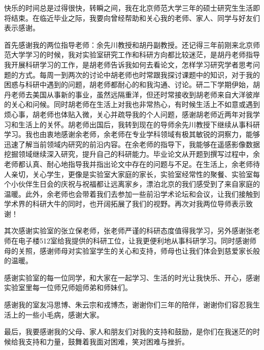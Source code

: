 
\begin{ack}
  快乐的时间总是过得很快，转瞬之间，我在北京师范大学三年的硕士研究生生活即将结束。在临近毕业之际，我要向曾经帮助和关心我的老师、家人、同学与好友们表示感谢。

  首先感谢我的两位指导老师：余先川教授和胡丹副教授。还记得三年前刚来北京师范大学学习的时候，我对实验室研究工作和科研方向都比较迷茫，是胡丹老师指导我开展科研学习的工作，是胡老师告诉我如何去看论文，怎样学习研究学者思考问题的方式。每周一到两次的讨论中胡老师也时常跟我探讨课题中的知识，对于我的困惑与科研中遇到的问题，胡老师都耐心的和我沟通、讨论。研二下学期伊始，胡丹老师去美国从事新的事业，虽然远隔重洋，但还时常接收到胡老师来自大洋彼岸的关心和问候。同时胡老师在生活上对我也非常热心，有时候生活上不如意或遇到烦心事，胡老师也体贴入微，关心并疏导我的个人问题，感谢胡老师近两年对我学习和生活上的关怀。胡老师出国后，我转到现在的导师余先川教授下继续从事科研学习。我也由衷地感谢余老师，余老师在专业学科领域有极其敏锐的洞察力，能够迅速了解当前领域内研究的前沿内容。在余老师的指导下，我能够在遥感影像数据挖掘领域继续深入研究，提升自己的科研能力。毕业论文从开题到撰写过程中，余老师都认真、耐心地指导我并指出论文中存在的问题与不足。在生活上，余老师待人亲切，关心学生，更像是实验室大家庭的家长，实验室经常性的聚餐、实验室每个小伙伴生日会的庆祝与祝福都让远离家乡，漂泊北京的我们感受到了来自家庭的温暖。此外，余老师也会带着我们去参加一些前沿学术论坛和会议，让我们接触到学术界的科研大牛的同时，也开阔拓展了我们的视野。再次对我两位导师表示致谢！

  其次感谢实验室的张立保老师，张老师严谨的科研态度值得我学习，另外感谢张老师在电子楼512室给我提供的科研工位，让我更便利地从事科研学习。同时感谢师母的关照，感谢师母对实验室学生的关心和支持，师母也让我们体会到慈爱家长般的温暖。

  感谢实验室的每一位同学，和大家在一起学习、生活的时光让我快乐、开心，感谢实验室里每一位师兄师姐师弟和师妹们。

  感谢我的室友冯思博、朱云宗和戎博杰，谢谢你们三年的陪伴，谢谢你们容忍我生活上的一些小毛病，感谢大家。

  最后，我要感谢我的父母、家人和朋友们对我的支持和鼓励，是你们在我迷茫的时候给我支持和力量，鼓舞着我面对困难，笑对困难与挫折。
\end{ack}
